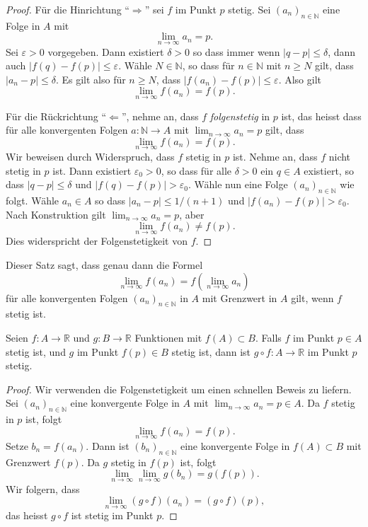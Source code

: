 \documentclass[../main.tex]{subfiles}
\begin{document}
\begin{proof}
  Für die Hinrichtung ``$\Rightarrow$'' sei $f$
  im Punkt $p$ stetig. Sei ${(a_{n})}_{n \in \mathbb{N}}$ 
  eine Folge in $A$ mit
  \[
    \lim_{n \to \infty} a_n = p.
  \]
  Sei $\varepsilon > 0$ vorgegeben.
  Dann existiert $\delta > 0$ so dass immer wenn
  $|q - p| \leq \delta$, dann auch
  $|f(q) - f(p)| \leq \varepsilon$.
  Wähle $N \in \mathbb{N}$, so
  dass für $n \in \mathbb{N}$ mit $n \geq N$ gilt,
  dass $|a_n - p| \leq \delta$.
  Es gilt also für $n \geq N$, dass
  $|f(a_n) - f(p)| \leq \varepsilon$.
  Also gilt
  \[
    \lim_{n \to \infty} f(a_n) = f(p).
  \]
  
  Für die Rückrichtung ``$\Leftarrow$'', nehme an,
  dass $f$ \emph{folgenstetig} in $p$ ist,
  das heisst dass für alle
  konvergenten Folgen $a \colon \mathbb{N} \to A$
  mit $\lim_{n \to \infty} a_n = p$ gilt,
  dass
  \[
    \lim_{n \to \infty} f(a_n) = f(p).
  \]
  Wir beweisen durch Widerspruch, dass
  $f$ stetig in $p$ ist.
  Nehme an, dass $f$ nicht stetig in $p$ ist.
  Dann existiert $\varepsilon_0 > 0$, so dass
  für alle $\delta > 0$ ein $q \in A$ 
  existiert, so dass
  $|q - p| \leq \delta$ und $|f(q) - f(p)| > \varepsilon_0$.
  Wähle nun eine Folge
  ${(a_{n})}_{n \in \mathbb{N}}$ wie folgt.
  Wähle $a_n \in A$ so dass
  $|a_n - p| \leq 1/(n+1)$ und $|f(a_n) - f(p)| > \varepsilon_0$.
  Nach Konstruktion gilt
  $\lim_{n \to \infty} a_n = p$, aber
  \[
    \lim_{n \to \infty} f(a_n) \neq f(p).
  \]
  Dies widerspricht der Folgenstetigkeit von $f$.
\end{proof}

Dieser Satz sagt, dass genau dann die Formel
\[
  \lim_{n \to \infty}  f(a_n) = f\left(\lim_{n \to \infty} a_n\right)
\]
für alle konvergenten Folgen ${(a_{n})}_{n \in \mathbb{N}}$ in $A$
mit Grenzwert in $A$
gilt, wenn $f$ stetig ist.

\begin{application}
  Seien $f \colon A \to \mathbb{R}$ und $g \colon B \to \mathbb{R}$
  Funktionen mit $f(A) \subset B$. Falls $f$ im Punkt $p \in A$ 
  stetig ist, und $g$ im Punkt $f(p) \in B$ stetig ist,
  dann ist $g \circ f\colon A \to \mathbb{R}$ im Punkt $p$ stetig.
\end{application}

\begin{proof}
  Wir verwenden die Folgenstetigkeit um einen schnellen
  Beweis zu liefern.
  Sei  ${(a_{n})}_{n \in \mathbb{N}}$ eine konvergente
  Folge in $A$ mit $\lim_{n \to \infty} a_n = p \in A$.
  Da $f$ stetig in $p$ ist, folgt
  \[
    \lim_{n \to \infty}f(a_n) = f(p).
  \]
  Setze $b_n = f(a_n).$ Dann ist ${(b_{n})}_{n \in \mathbb{N}}$ 
  eine konvergente Folge in $f(A) \subset B$ mit Grenzwert
  $f(p)$.
  Da $g$ stetig in $f(p)$ ist, folgt
  \[
    \lim_{n \to \infty} \lim_{n \to \infty} g(b_n) = g(f(p)).
  \]
  Wir folgern, dass
  \[
    \lim_{n \to \infty} (g \circ f)(a_n) = (g \circ f)(p),
  \]
  das heisst $g \circ f$ ist stetig im Punkt $p$.
\end{proof}
\end{document}
